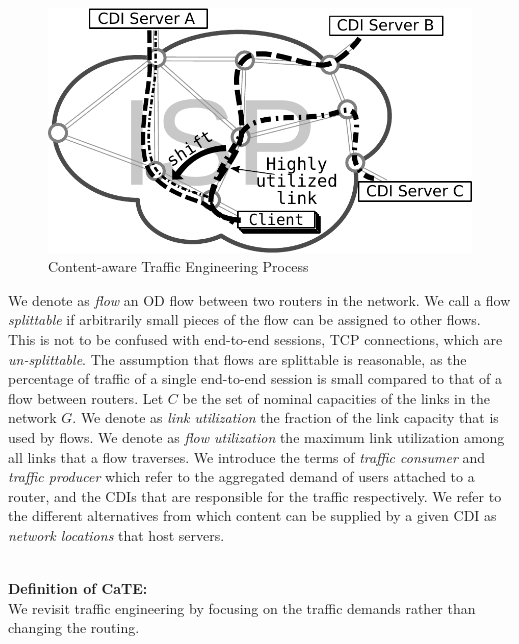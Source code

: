 \begin{figure}[tbp]
\center\includegraphics[width=0.90\linewidth]{figures-pdf/trafficShift-illustration}
\caption{Content-aware Traffic Engineering Process}
\label{fig:Content-aware-illustration2}
\vspace{-1.5em}
\end{figure}


\smallskip
{}\label{sec:Terminology}
We denote as {\it flow} an OD flow between two routers in the network.  We call
a flow {\it splittable} if arbitrarily small pieces of the flow can be assigned
to other flows.  This is not to be confused with end-to-end sessions, \ie TCP
connections, which are \emph{un-splittable}.  The assumption that flows are
splittable is reasonable, as the percentage of traffic of a single end-to-end
session is small compared to that of a flow between routers. Let $C$ be the set
of nominal capacities of the links in the network $G$. We denote as {\it link
utilization} the fraction of the link capacity that is used by flows. We denote
as {\it flow utilization} the maximum link utilization among all links that a
flow traverses. We introduce the terms of {\it traffic consumer} and {\it
traffic producer} which refer to the aggregated demand of users attached to a
router, and the CDIs that are responsible for the traffic respectively. We
refer to the different alternatives from which content can be supplied by a
given CDI as \emph{network locations} that host servers.


\ \\\noindent\textbf{Definition of CaTE:}\label{sec:CaTE-Definitions}\\\noindent
We revisit traffic engineering by focusing on the traffic demands rather than
changing the routing.

